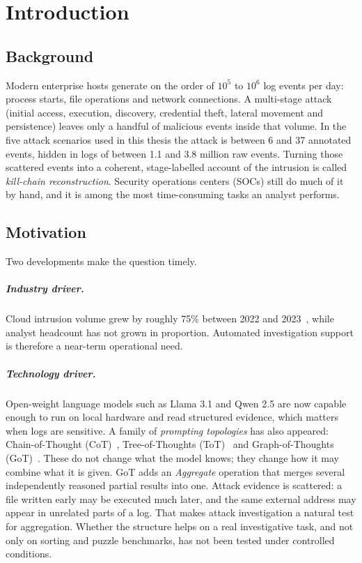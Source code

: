 \chapter{Introduction}
\label{ch:intro}

\section{Background}
Modern enterprise hosts generate on the order of $10^{5}$ to $10^{6}$ log events per day: process starts, file operations and network connections. A multi-stage attack (initial access, execution, discovery, credential theft, lateral movement and persistence) leaves only a handful of malicious events inside that volume. In the five attack scenarios used in this thesis the attack is between 6 and 37 annotated events, hidden in logs of between 1.1 and 3.8 million raw events. Turning those scattered events into a coherent, stage-labelled account of the intrusion is called \emph{kill-chain reconstruction}. Security operations centers (SOCs) still do much of it by hand, and it is among the most time-consuming tasks an analyst performs.

\section{Motivation}
Two developments make the question timely.

\paragraph{Industry driver.} Cloud intrusion volume grew by roughly 75\% between 2022 and 2023~\cite{crowdstrike2024}, while analyst headcount has not grown in proportion. Automated investigation support is therefore a near-term operational need.

\paragraph{Technology driver.} Open-weight language models such as Llama 3.1 and Qwen 2.5 are now capable enough to run on local hardware and read structured evidence, which matters when logs are sensitive. A family of \emph{prompting topologies} has also appeared: Chain-of-Thought (CoT)~\cite{wei2022cot}, Tree-of-Thoughts (ToT)~\cite{yao2023tot} and Graph-of-Thoughts (GoT)~\cite{besta2024got}. These do not change what the model knows; they change how it may combine what it is given. GoT adds an \emph{Aggregate} operation that merges several independently reasoned partial results into one. Attack evidence is scattered: a file written early may be executed much later, and the same external address may appear in unrelated parts of a log. That makes attack investigation a natural test for aggregation. Whether the structure helps on a real investigative task, and not only on sorting and puzzle benchmarks, has not been tested under controlled conditions.

